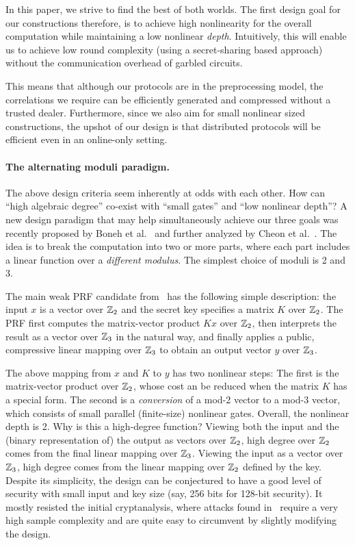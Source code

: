     \hspace*{1em} In this paper, we strive to find the best of both worlds. The first design goal for our constructions therefore, is to achieve high nonlinearity for the overall computation while maintaining a low nonlinear \textit{depth}. Intuitively, this will enable us to achieve low round complexity (using a secret-sharing based approach) without the communication overhead of garbled circuits.

    \hspace*{1em} This means that although our protocols are in the preprocessing model, the correlations we require can be efficiently generated and compressed without a trusted dealer. Furthermore, since we also aim for small nonlinear sized constructions, the upshot of our design is that distributed protocols will be efficient even in an online-only setting. 
\fi

\paragraph{\bf The alternating moduli paradigm.} The above design criteria seem inherently at odds with each other. How can ``high algebraic degree'' co-exist with ``small gates'' and ``low nonlinear depth''? A new design paradigm that may help simultaneously achieve our three goals was recently proposed by Boneh et al.~\cite{boneh2018-darkmatter} and further analyzed by Cheon et al.~\cite{adventures}. The idea is to break the computation into two or more parts, where each part includes a linear function over a {\em different modulus}. The simplest choice of moduli is 2 and 3. 

The main weak PRF candidate from~\cite{boneh2018-darkmatter} has the following simple description: the input $x$ is a vector over  $\mathbb{Z}_2$ and the secret key specifies a matrix $K$ over  $\mathbb{Z}_2$. The PRF first computes the matrix-vector product $Kx$ over  $\mathbb{Z}_2$, then interprets the result as a vector over $\mathbb{Z}_3$ in the natural way,  and finally applies a public, compressive linear mapping over $\mathbb{Z}_3$ to obtain an output vector $y$ over $\mathbb{Z}_3$. 

The above mapping from $x$ and $K$ to $y$ has two nonlinear steps: The first is the matrix-vector product over $\mathbb{Z}_2$, whose cost an be reduced when the matrix $K$ has a special form. The second is a {\em conversion} of a mod-2 vector to a mod-3 vector, which consists of small parallel (finite-size) nonlinear gates.  Overall, the nonlinear depth is 2. Why is this a high-degree function? Viewing both the input and the (binary representation of) the output as vectors over $\mathbb{Z}_2$, high degree over $\mathbb{Z}_2$ comes from the final linear mapping over $\mathbb{Z}_3$. Viewing the input as a vector over $\mathbb{Z}_3$, high degree comes from the linear mapping over $\mathbb{Z}_2$ defined by the key.  Despite its simplicity, the design can be conjectured to have a good level of security with small input and key size (say, 256 bits for 128-bit security). It mostly resisted the initial cryptanalysis, where attacks found in~\cite{adventures} require a very high sample complexity and are quite easy to circumvent by slightly modifying the design.   

